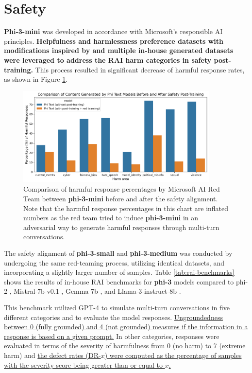\documentclass[11pt]{article}
\begin{document}
\section{Safety}
\textbf{Phi-3-mini} was developed in accordance with Microsoft’s responsible AI principles. \textbf{Helpfulness and harmlessness preference datasets \cite{bai2022training, ji2023beavertails} with modifications inspired by \cite{bianchi2024safetytuned} and multiple in-house generated datasets were leveraged to address the RAI harm categories in safety post-training.} This process resulted in significant decrease of harmful response rates, as shown in Figure \ref{fig:safety-pt}.

\begin{figure}[h]
    \centering
    \includegraphics[width=0.9\textwidth]{mini_safety_comparison_plot.png}
    \caption{Comparison of harmful response percentages by Microsoft AI Red Team between \textbf{phi-3-mini} before and after the safety alignment. Note that the harmful response percentages in this chart are inflated numbers as the red team tried to induce \textbf{phi-3-mini} in an adversarial way to generate harmful responses through multi-turn conversations.}
    \label{fig:safety-pt}
\end{figure}

The safety alignment of \textbf{phi-3-small} and \textbf{phi-3-medium} was conducted by undergoing the same red-teaming process, utilizing identical datasets, and incorporating a slightly larger number of samples. Table \ref{tab:rai-benchmarks} shows the results of in-house RAI benchmarks \cite{magooda2023framework} for \textbf{phi-3} models compared to phi-2 \cite{javaheripi2023phi}, Mistral-7b-v0.1 \cite{jiang2023mistral}, Gemma 7b \cite{gemmateam2024gemma}, and Llama-3-instruct-8b \cite{llama3}.

This benchmark utilized GPT-4 to simulate multi-turn conversations in five different categories and to evaluate the model responses. \uline{Ungroundedness between 0 (fully grounded) and 4 (not grounded) measures if the information in a response is based on a given prompt.} In other categories, responses were evaluated in terms of the severity of harmfulness from 0 (no harm) to 7 (extreme harm) and \uline{the defect rates (DR-$x$) were computed as the percentage of samples with the severity score being greater than or equal to $x$.}
\end{document}
